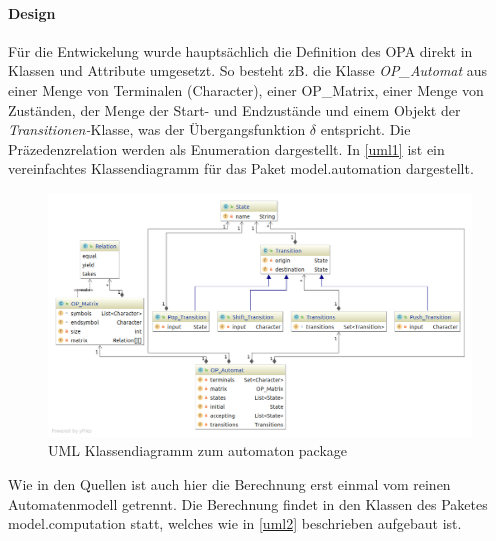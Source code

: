 \paragraph*{Design}
Für die Entwickelung wurde hauptsächlich die Definition des OPA direkt in Klassen und Attribute umgesetzt. So besteht zB. die Klasse \textit{OP\_Automat} aus einer Menge von Terminalen (Character), einer OP\_Matrix, einer Menge von Zuständen, der Menge der Start- und Endzustände und einem Objekt der \textit{Transitionen-}Klasse, was der Übergangsfunktion $\delta$ entspricht. Die Präzedenzrelation werden als Enumeration dargestellt. In \autoref{uml1} ist ein vereinfachtes Klassendiagramm für das Paket model.automation dargestellt. 
\begin{figure}
\centering
\includegraphics[scale=0.3]{sections/automaton}
\caption{UML Klassendiagramm zum automaton package}
\label{uml1}
\end{figure}
 Wie in den Quellen ist auch hier die Berechnung erst einmal vom reinen Automatenmodell getrennt. Die Berechnung findet in den Klassen des Paketes model.computation statt, welches wie in \autoref{uml2} beschrieben aufgebaut ist. 
